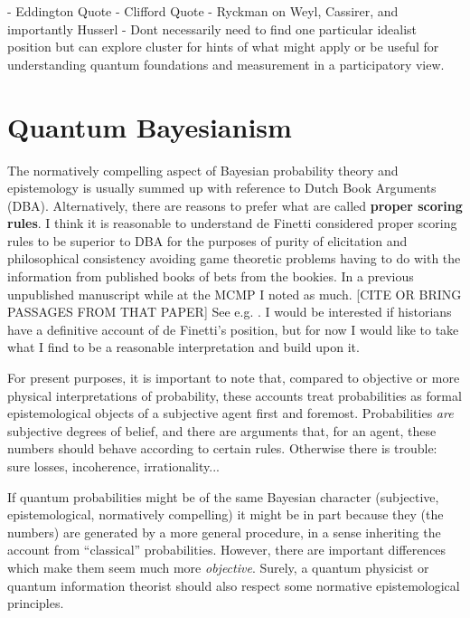 - Eddington Quote
- Clifford Quote
- Ryckman on Weyl, Cassirer, and importantly Husserl
- Dont necessarily need to find one particular idealist position but can explore cluster for hints of what might apply or be useful for understanding quantum foundations and measurement in a participatory view.




\section{Quantum Bayesianism}

The normatively compelling aspect of Bayesian probability theory and epistemology is usually summed up with reference to Dutch Book Arguments (DBA).  Alternatively, there are reasons to prefer what are called \textbf{proper scoring rules}.  I think it is reasonable to understand de Finetti considered proper scoring rules to be superior to DBA for the purposes of purity of elicitation and philosophical consistency avoiding game theoretic problems having to do with the information from published books of bets from the bookies.  In a previous unpublished manuscript while at the MCMP I noted as much.  [CITE OR BRING PASSAGES FROM THAT PAPER]  See e.g. \citep{deFinetti1981a, deFinetti1990, deFinetti2008}.  I would be interested if historians have a definitive account of de Finetti's position, but for now I would like to take what I find to be a reasonable interpretation and build upon it.




For present purposes, it is important to note that, compared to objective or more physical interpretations of probability, these accounts treat probabilities as formal epistemological objects of a subjective agent first and foremost.  Probabilities \emph{are} subjective degrees of belief, and there are arguments that, for an agent, these numbers should behave according to certain rules.  Otherwise there is trouble: sure losses, incoherence, irrationality...

If quantum probabilities might be of the same Bayesian character (subjective, epistemological, normatively compelling) it might be in part because they (the numbers) are generated by a more general procedure, in a sense inheriting the account from ``classical'' probabilities.  However, there are important differences which make them seem much more \emph{objective}.  Surely, a quantum physicist or quantum information theorist should also respect some normative epistemological principles.  
 

